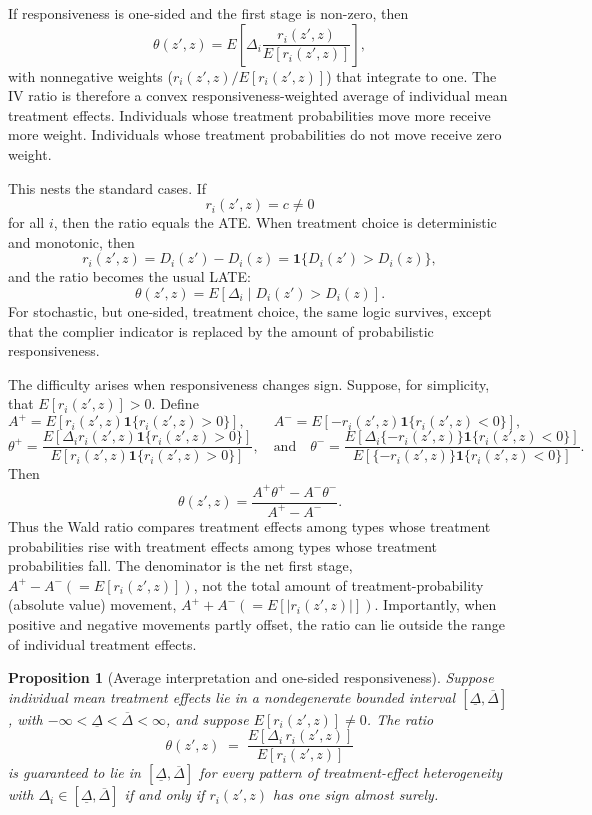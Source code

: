 \documentclass[11pt]{article}
\newtheorem{proposition}{Proposition}
\newcommand{\1}{\mathbf{1}}
\begin{document}
If responsiveness is one-sided and the first stage is non-zero, then
\[
\theta(z',z)
=
E\!\left[
\Delta_i
\frac{r_i(z',z)}{E[r_i(z',z)]}
\right],
\]
with nonnegative weights ($r_i(z',z)/E[r_i(z',z)]$) that integrate to one. The IV ratio is therefore a convex
responsiveness-weighted average of individual mean treatment effects. Individuals whose
treatment probabilities move more receive more weight. Individuals whose treatment
probabilities do not move receive zero weight.

This nests the standard cases. If
\[
r_i(z',z)=c\neq 0
\]
for all \(i\), then the ratio equals the ATE. When treatment choice is deterministic and
monotonic, then
\[
r_i(z',z)=D_i(z')-D_i(z)
=
\mathbf{1}\{D_i(z')>D_i(z)\},
\]
and the ratio becomes the usual LATE:
\[
\theta(z',z)
=
E[\Delta_i\mid D_i(z')>D_i(z)].
\]
For stochastic, but one-sided, treatment choice, the same logic survives, except that the complier indicator is replaced by the amount of probabilistic responsiveness.

The difficulty arises when responsiveness changes sign. Suppose, for simplicity, that
\(E[r_i(z',z)]>0\). Define
\[
A^+
=
E\!\left[r_i(z',z)\mathbf{1}\{r_i(z',z)>0\}\right],
\qquad
A^-
=
E\!\left[-r_i(z',z)\mathbf{1}\{r_i(z',z)<0\}\right],
\]
\[
\theta^+
=
\frac{
E\!\left[\Delta_i r_i(z',z)\mathbf{1}\{r_i(z',z)>0\}\right]
}{
E\!\left[r_i(z',z)\mathbf{1}\{r_i(z',z)>0\}\right]
},
\quad \textrm{and} \quad
\theta^-
=
\frac{
E\!\left[\Delta_i\{-r_i(z',z)\}\mathbf{1}\{r_i(z',z)<0\}\right]
}{
E\!\left[\{-r_i(z',z)\}\mathbf{1}\{r_i(z',z)<0\}\right]
}.
\]
Then
\[
\theta(z',z)
=
\frac{A^+\theta^+-A^-\theta^-}{A^+-A^-}.
\]
Thus the Wald ratio compares treatment effects among types whose treatment probabilities
rise with treatment effects among types whose treatment probabilities fall. The denominator
is the net first stage, \(A^+-A^-(= E[r_i(z',z)])\), not the total amount of treatment-probability (absolute value) movement,
\(A^++A^- (= E[|r_i(z',z)|])\). Importantly, when positive and negative movements partly offset, the ratio can lie outside the range of individual treatment effects.



\begin{proposition}[Average interpretation and one-sided responsiveness]
\label{prop:onesided}
Suppose individual mean treatment effects lie in a nondegenerate bounded
interval $[\underline{\Delta}, \overline{\Delta}]$, with
$-\infty < \underline{\Delta} < \overline{\Delta} < \infty$, and suppose
$E[r_i(z',z)] \neq 0$. The ratio
\[
\theta(z',z) \;=\; \frac{E[\Delta_i\, r_i(z',z)]}{E[r_i(z',z)]}
\]
is guaranteed to lie in $[\underline{\Delta}, \overline{\Delta}]$ for every
pattern of treatment-effect heterogeneity with
$\Delta_i \in [\underline{\Delta}, \overline{\Delta}]$ if and only if
$r_i(z',z)$ has one sign almost surely.
\end{proposition}
\end{document}
